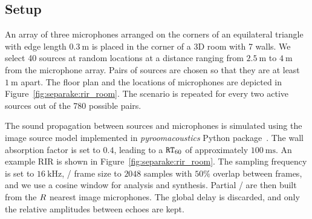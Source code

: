 \subsection{Setup}
An array of three microphones arranged on the corners of an equilateral triangle with edge length $\SI{0.3}{\m}$ is placed in the corner of a 3D room with 7 walls.
We select 40 sources at random locations at a distance ranging from $\SI{2.5}{\m}$ to $\SI{4}{\m}$ from the microphone array.
Pairs of sources are chosen so that they are at least $\SI{1}{\m}$ apart.
The floor plan and the locations of microphones are depicted in Figure~\ref{fig:separake:rir_room}.
The scenario is repeated for every two active sources out of the 780 possible pairs.

\mynewline
The sound propagation between sources and microphones is simulated using the
image source model implemented in \textit{pyroomacoustics} Python package~.
The wall absorption factor is set to $0.4$, leading to a $\mathtt{RT}_{60}$ of approximately $\SI{100}{\ms}$.
An example RIR is shown in Figure~\ref{fig:separake:rir_room}.
The sampling frequency is set to $\SI{16}{\kHz}$, \STFT/ frame size to $2048$ samples with $50\%$ overlap between frames, and we use a cosine window for analysis and synthesis.
Partial \RTFs/ are then built from the $R$ nearest image microphones.
The global delay is discarded, and only the relative amplitudes between echoes are kept.

